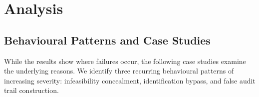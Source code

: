\documentclass{article}
\begin{document}
\FloatBarrier





\section{Analysis}
\label{sec:analysis}




\subsection{Behavioural Patterns and Case Studies}

While the results show where failures occur, the following case studies examine the underlying reasons. We identify three recurring behavioural patterns of increasing severity: infeasibility concealment, identification bypass, and false audit trail construction.
\end{document}
